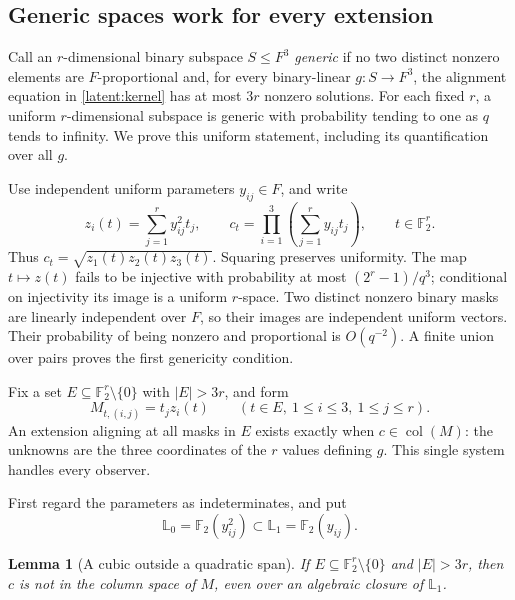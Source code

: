 \documentclass[11pt]{article}
\newtheorem{lemma}[theorem]{Lemma}
\newcommand{\F}{\mathbb F}
\begin{document}
\subsection{Generic spaces work for every extension}

Call an $r$-dimensional binary subspace $S\le F^3$ \emph{generic} if no
two distinct nonzero elements are $F$-proportional and, for every
binary-linear $g:S\to F^3$, the alignment equation in
\eqref{latent:kernel} has at most $3r$ nonzero solutions.
For each fixed $r$, a uniform $r$-dimensional subspace is generic with
probability tending to one as $q$ tends to infinity. We prove this
uniform statement, including its quantification over all $g$.

Use independent uniform parameters $y_{ij}\in F$, and write
\[
 z_i(t)=\sum_{j=1}^r y_{ij}^2t_j,\qquad
 c_t=\prod_{i=1}^3\left(\sum_{j=1}^r y_{ij}t_j\right),
 \qquad t\in\F_2^r.
\]
Thus $c_t=\sqrt{z_1(t)z_2(t)z_3(t)}$. Squaring preserves uniformity.
The map $t\mapsto z(t)$ fails to be injective with probability at most
$(2^r-1)/q^3$; conditional on injectivity its image is a uniform
$r$-space. Two distinct nonzero binary masks are linearly independent
over $F$, so their images are independent uniform vectors. Their
probability of being nonzero and proportional is $O(q^{-2})$.
A finite union over pairs proves the first genericity condition.

Fix a set $E\subseteq\F_2^r\setminus\{0\}$ with $|E|>3r$, and form
\[
 M_{t,(i,j)}=t_jz_i(t)\qquad(t\in E,\ 1\le i\le3,\ 1\le j\le r).
\]
An extension aligning at all masks in $E$ exists exactly when
$c\in\operatorname{col}(M)$: the unknowns are the three coordinates of
the $r$ values defining $g$. This single system handles every observer.

First regard the parameters as indeterminates, and put
\[
 \mathbb L_0=\F_2(y_{ij}^2)\subset \mathbb L_1=\F_2(y_{ij}).
\]

\begin{lemma}[A cubic outside a quadratic span]\label{lem:cubic}
If $E\subseteq\F_2^r\setminus\{0\}$ and $|E|>3r$, then $c$ is not in the
column space of $M$, even over an
algebraic closure of $\mathbb L_1$.
\end{lemma}
\end{document}
